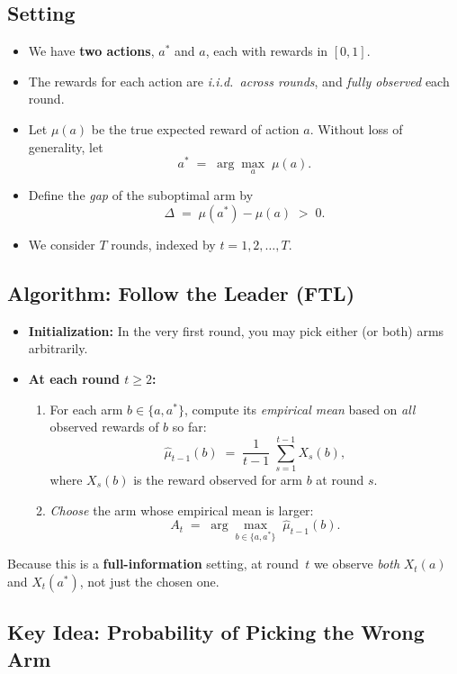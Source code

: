 \subsection*{Setting}

\begin{itemize}
\item We have \textbf{two actions}, $a^*$ and $a$, each with rewards in $[0,1]$.
\item The rewards for each action are \emph{i.i.d.\ across rounds}, and \emph{fully observed} each round.
\item Let $\mu(a)$ be the true expected reward of action $a$.  Without loss of generality, let
\[
  a^* \;=\;\arg\max_{a}\;\mu(a).
\]
\item Define the \emph{gap} of the suboptimal arm by
\[
  \Delta
  \;=\;
  \mu(a^*) - \mu(a)
  \;>\;0.
\]
\item We consider $T$ rounds, indexed by $t=1,2,\dots,T$.
\end{itemize}

\subsection*{Algorithm:\; Follow the Leader (FTL)}

\begin{itemize}
\item \textbf{Initialization:} In the very first round, you may pick either (or both) arms arbitrarily.
\item \textbf{At each round $t \ge 2$:}
  \begin{enumerate}
  \item For each arm $b \in \{a,a^*\}$, compute its \emph{empirical mean} based on \emph{all} observed rewards of $b$ so far:
  \[
    \hat{\mu}_{t-1}(b)
    \;=\;
    \frac{1}{t-1}\;\sum_{s=1}^{t-1} X_s(b),
  \]
  where $X_s(b)$ is the reward observed for arm $b$ at round $s$.
  \item \emph{Choose} the arm whose empirical mean is larger:
  \[
    A_t 
    \;=\; 
    \arg\max_{b \in \{a,a^*\}} \;\hat{\mu}_{t-1}(b).
  \]
  \end{enumerate}
\end{itemize}
Because this is a \textbf{full-information} setting, at round~$t$ we observe \emph{both} $X_t(a)$ and $X_t(a^*)$, not just the chosen one.

\subsection*{Key Idea:\; Probability of Picking the Wrong Arm}

